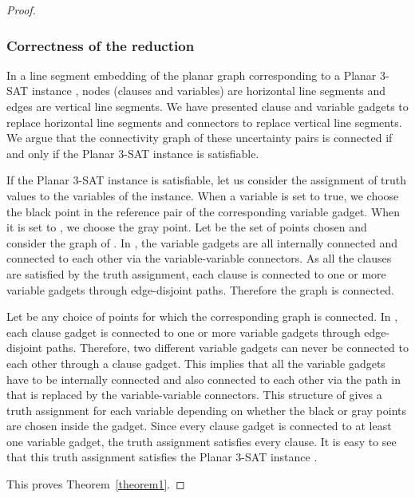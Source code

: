 \begin{proof}
\subsubsection*{Correctness of the reduction}
In a line segment embedding of the planar graph  corresponding to a Planar 3-SAT instance , nodes (clauses and variables) are horizontal line segments and edges are vertical line segments.  We have presented clause and variable gadgets to replace horizontal line segments and connectors to replace vertical line segments.  We argue that the connectivity graph  of these uncertainty pairs is connected if and only if the Planar 3-SAT instance  is satisfiable.

If the Planar 3-SAT instance  is satisfiable, let us consider the assignment of truth values to the variables of the instance.  When a variable is set to true, we choose the black point in the reference pair of the corresponding variable gadget.  When it is set to \false, we choose the gray point.
Let  be the set of points chosen and consider the graph  of . In , the variable gadgets are all internally connected and connected to each other via the variable-variable connectors.  As all the clauses are satisfied by the truth assignment, each clause is connected to one or more variable gadgets through edge-disjoint paths. Therefore the graph  is connected.

Let  be any choice of points for which the corresponding graph  is connected. In , each clause gadget is connected to one or more variable gadgets through edge-disjoint paths. Therefore, two different variable gadgets can never be connected to each other through a clause gadget.
This implies that all the variable gadgets have to be internally connected and also connected to each other via the path in  that is replaced by the  variable-variable connectors. This structure of  gives a truth assignment for each variable depending on whether the black or gray points are chosen inside the gadget. Since every clause gadget is connected to at least one variable gadget, the truth assignment satisfies every clause.  It is easy to see that this truth assignment satisfies the Planar 3-SAT instance .


This proves Theorem~\ref{theorem1}. \hfill
\end{proof}






